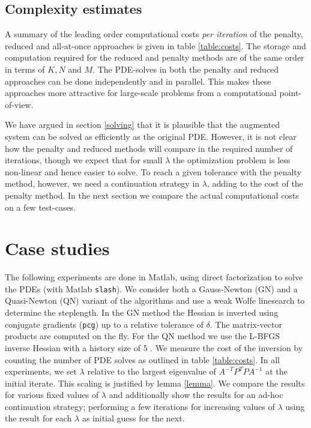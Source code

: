 \documentclass{iopart}
\begin{document}
\subsection{Complexity estimates}
A summary of the leading order computational costs \emph{per iteration} of the penalty, reduced and all-at-once approaches is given in table \ref{table:costs}. 
The storage and computation required for the reduced and penalty methods are of the same order in terms of $K,N$ and $M$. The PDE-solves in both the penalty and reduced approaches can be done independently and in parallel. This makes these approaches more attractive for large-scale problems from a computational point-of-view.

We have argued in section \ref{solving} that it is plausible that the augmented system can be solved as efficiently as the original PDE. However,
it is not clear how the penalty and reduced methods will compare in the required number of iterations, though we expect that for small $\lambda$ the optimization problem is less non-linear and hence easier to solve. To reach a given tolerance with the penalty method, however, we need a continuation strategy in $\lambda$, adding to the cost of the penalty method. In the next section we compare the actual computational costs on a few test-cases.

\section{Case studies}
\label{examples}
The following experiments are done in Matlab, using direct factorization to solve the PDEs (with Matlab \texttt{slash}). We consider both a Gauss-Newton (GN) and a Quasi-Newton (QN) variant of the algorithms and use a weak Wolfe linesearch to determine the steplength. In the GN method the Hessian is inverted using conjugate gradients (\texttt{pcg}) up to a relative tolerance of $\delta$. The matrix-vector products are computed on the fly. For the QN method we use the L-BFGS inverse Hessian with a history size of 5 \cite{Nocedal}. We measure the cost of the inversion by counting the number of PDE solves as outlined in table \ref{table:costs}. In all experiments, we set $\lambda$ relative to the largest eigenvalue of $A^{-T}P^T\!PA^{-1}$ at the initial iterate. This scaling is justified by lemma \ref{lemma}. We compare the results for various fixed values of $\lambda$ and additionally show the results for an ad-hoc continuation strategy; performing a few iterations for increasing values of $\lambda$ using the result for each $\lambda$ as initial guess for the next.
\end{document}
